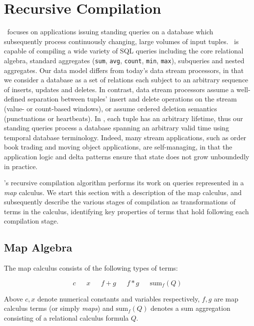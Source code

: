 \section{Recursive Compilation}
\def\Dom{\mathrm{Dom}}
\def\algsum{\mathrm{sum}}
\def\algif{\mathrm{if}}
\def\algthen{\mathrm{then}}
\def\algelse{\mathrm{else}}
\def\algforeach{\mathrm{foreach}}

\newcommand\caret{\mathbin{\char`\^}}
\renewcommand{\algorithmiccomment}[1]{// #1}

\compiler\ focuses on applications issuing standing queries on a database which
subsequently process continuously changing, large volumes of input tuples.
\compiler\ is capable of compiling a wide variety of SQL queries including the
core relational algebra, standard aggregates (\texttt{sum}, \texttt{avg},
\texttt{count}, \texttt{min}, \texttt{max}), subqueries and nested aggregates.
Our data model differs from today's data stream processors, in that we consider
a database as a set of relations each subject to an arbitrary sequence of
inserts, updates and deletes. In contrast, data stream processors assume a
well-defined separation between tuples' insert and delete operations on the
stream (value- or count-based windows), or assume ordered deletion semantics
(punctuations or heartbeats). In \compiler, each tuple has an arbitrary
lifetime, thus our standing queries process a database spanning an arbitrary
valid time using temporal database terminology. Indeed, many stream
applications, such as order book trading and moving object applications, are
self-managing, in that the application logic and delta patterns ensure that
state does not grow unboundedly in practice.

\compiler's recursive compilation algorithm performs its work on queries
represented in a \textit{map} calculus. We start this section with a description
of the map calculus, and subsequently describe the various stages of compilation
as transformations of terms in the calculus, identifying key properties of terms
that hold following each compilation stage.

\subsection{Map Algebra}
The map calculus consists of the following types of terms:

\[
c 
\quad\;\;
x
\quad\;\;
f+g
\quad\;\;
f*g
\quad\;\;
\algsum_f(Q)
\]

Above $c,x$ denote numerical constants and variables respectively, $f,g$ are map
calculus terms (or simply \textit{maps}) and $\algsum_f(Q)$ denotes a sum
aggregation consisting of a relational calculus formula $Q$.

